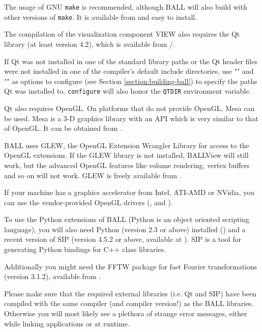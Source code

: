 The usage of GNU {\tt make} is recommended, although BALL will also build with
other versions of {\tt make}. It is available from 
and easy to install.

The compilation of the visualization component VIEW also requires the Qt 
library (at least version 4.2), which is available from
/.

If Qt was not installed in one of the standard library paths or the
Qt header files were not installed in one of the compiler's default
include directories, use \mbox{""} and
\mbox{""} as options to configure (see
Section \ref{section:building-ball}) to specify the paths Qt was installed
to. {\tt configure} will also honor the {\tt QTDIR} environment variable.

Qt also requires OpenGL. On platforms that do not provide OpenGL, Mesa can
be used. Mesa is a 3-D graphics library with an API which is 
very similar to that of OpenGL. It can be obtained from 
.

BALL uses GLEW, the OpenGL Extension Wrangler Library for access to the OpenGL
extensions. If the GLEW library is not installed, BALLView will still work, but
the advanced OpenGL features like volume rendering, vertex buffers and so on
will not work. GLEW is freely available from .

If your machine has a graphics accelerator from Intel, ATI-AMD or NVidia, you
can use the vendor-provided OpenGL drivers
(,
 and
).

To use the Python extensions of BALL (Python is an object oriented scripting
language), you will also need Python (version 2.3 or above) installed
() and a recent version of SIP (version 4.5.2 or
above, available at ). SIP is a
tool for generating Python bindings for C++ class libraries.

Additionally you might need the FFTW package for fast Fourier transformations
(version 3.1.2), available from .

Please make sure that the required external \CPP libraries (i.e. Qt and SIP)
have been compiled with the same compiler (and compiler version!) as the BALL
libraries. Otherwise you will most likely see a plethora of strange error
messages, either while linking applications or at runtime.

